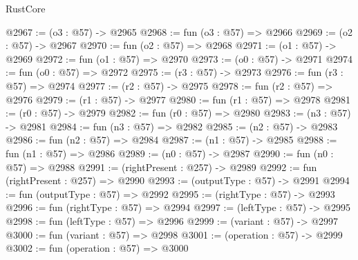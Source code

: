 \begin{lexlean}{RustCore}
\begin{coremodule}
@2967 := (o3 : @57) -> @2965
@2968 := fun (o3 : @57) => @2966
@2969 := (o2 : @57) -> @2967
@2970 := fun (o2 : @57) => @2968
@2971 := (o1 : @57) -> @2969
@2972 := fun (o1 : @57) => @2970
@2973 := (o0 : @57) -> @2971
@2974 := fun (o0 : @57) => @2972
@2975 := (r3 : @57) -> @2973
@2976 := fun (r3 : @57) => @2974
@2977 := (r2 : @57) -> @2975
@2978 := fun (r2 : @57) => @2976
@2979 := (r1 : @57) -> @2977
@2980 := fun (r1 : @57) => @2978
@2981 := (r0 : @57) -> @2979
@2982 := fun (r0 : @57) => @2980
@2983 := (n3 : @57) -> @2981
@2984 := fun (n3 : @57) => @2982
@2985 := (n2 : @57) -> @2983
@2986 := fun (n2 : @57) => @2984
@2987 := (n1 : @57) -> @2985
@2988 := fun (n1 : @57) => @2986
@2989 := (n0 : @57) -> @2987
@2990 := fun (n0 : @57) => @2988
@2991 := (rightPresent : @257) -> @2989
@2992 := fun (rightPresent : @257) => @2990
@2993 := (outputType : @57) -> @2991
@2994 := fun (outputType : @57) => @2992
@2995 := (rightType : @57) -> @2993
@2996 := fun (rightType : @57) => @2994
@2997 := (leftType : @57) -> @2995
@2998 := fun (leftType : @57) => @2996
@2999 := (variant : @57) -> @2997
@3000 := fun (variant : @57) => @2998
@3001 := (operation : @57) -> @2999
@3002 := fun (operation : @57) => @3000
\end{coremodule}
\end{lexlean}
